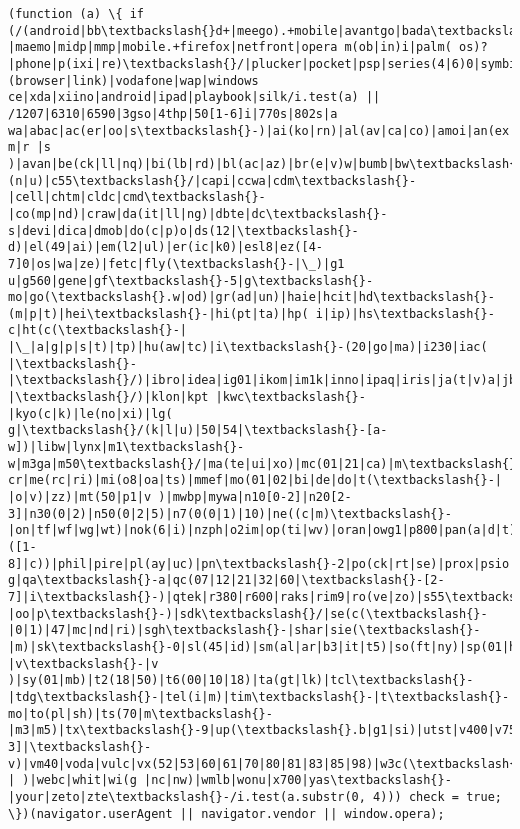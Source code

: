 \documentclass[11pt]{article}
\begin{document}
\begin{Verbatim}[commandchars=\\\{\}]
            (function (a) \{ if (/(android|bb\textbackslash{}d+|meego).+mobile|avantgo|bada\textbackslash{}/|blackberry|blazer|compal|elaine|fennec|hiptop|iemobile|ip(hone|od)|iris|kindle|lge |maemo|midp|mmp|mobile.+firefox|netfront|opera m(ob|in)i|palm( os)?|phone|p(ixi|re)\textbackslash{}/|plucker|pocket|psp|series(4|6)0|symbian|treo|up\textbackslash{}.(browser|link)|vodafone|wap|windows ce|xda|xiino|android|ipad|playbook|silk/i.test(a) || /1207|6310|6590|3gso|4thp|50[1-6]i|770s|802s|a wa|abac|ac(er|oo|s\textbackslash{}-)|ai(ko|rn)|al(av|ca|co)|amoi|an(ex|ny|yw)|aptu|ar(ch|go)|as(te|us)|attw|au(di|\textbackslash{}-m|r |s )|avan|be(ck|ll|nq)|bi(lb|rd)|bl(ac|az)|br(e|v)w|bumb|bw\textbackslash{}-(n|u)|c55\textbackslash{}/|capi|ccwa|cdm\textbackslash{}-|cell|chtm|cldc|cmd\textbackslash{}-|co(mp|nd)|craw|da(it|ll|ng)|dbte|dc\textbackslash{}-s|devi|dica|dmob|do(c|p)o|ds(12|\textbackslash{}-d)|el(49|ai)|em(l2|ul)|er(ic|k0)|esl8|ez([4-7]0|os|wa|ze)|fetc|fly(\textbackslash{}-|\_)|g1 u|g560|gene|gf\textbackslash{}-5|g\textbackslash{}-mo|go(\textbackslash{}.w|od)|gr(ad|un)|haie|hcit|hd\textbackslash{}-(m|p|t)|hei\textbackslash{}-|hi(pt|ta)|hp( i|ip)|hs\textbackslash{}-c|ht(c(\textbackslash{}-| |\_|a|g|p|s|t)|tp)|hu(aw|tc)|i\textbackslash{}-(20|go|ma)|i230|iac( |\textbackslash{}-|\textbackslash{}/)|ibro|idea|ig01|ikom|im1k|inno|ipaq|iris|ja(t|v)a|jbro|jemu|jigs|kddi|keji|kgt( |\textbackslash{}/)|klon|kpt |kwc\textbackslash{}-|kyo(c|k)|le(no|xi)|lg( g|\textbackslash{}/(k|l|u)|50|54|\textbackslash{}-[a-w])|libw|lynx|m1\textbackslash{}-w|m3ga|m50\textbackslash{}/|ma(te|ui|xo)|mc(01|21|ca)|m\textbackslash{}-cr|me(rc|ri)|mi(o8|oa|ts)|mmef|mo(01|02|bi|de|do|t(\textbackslash{}-| |o|v)|zz)|mt(50|p1|v )|mwbp|mywa|n10[0-2]|n20[2-3]|n30(0|2)|n50(0|2|5)|n7(0(0|1)|10)|ne((c|m)\textbackslash{}-|on|tf|wf|wg|wt)|nok(6|i)|nzph|o2im|op(ti|wv)|oran|owg1|p800|pan(a|d|t)|pdxg|pg(13|\textbackslash{}-([1-8]|c))|phil|pire|pl(ay|uc)|pn\textbackslash{}-2|po(ck|rt|se)|prox|psio|pt\textbackslash{}-g|qa\textbackslash{}-a|qc(07|12|21|32|60|\textbackslash{}-[2-7]|i\textbackslash{}-)|qtek|r380|r600|raks|rim9|ro(ve|zo)|s55\textbackslash{}/|sa(ge|ma|mm|ms|ny|va)|sc(01|h\textbackslash{}-|oo|p\textbackslash{}-)|sdk\textbackslash{}/|se(c(\textbackslash{}-|0|1)|47|mc|nd|ri)|sgh\textbackslash{}-|shar|sie(\textbackslash{}-|m)|sk\textbackslash{}-0|sl(45|id)|sm(al|ar|b3|it|t5)|so(ft|ny)|sp(01|h\textbackslash{}-|v\textbackslash{}-|v )|sy(01|mb)|t2(18|50)|t6(00|10|18)|ta(gt|lk)|tcl\textbackslash{}-|tdg\textbackslash{}-|tel(i|m)|tim\textbackslash{}-|t\textbackslash{}-mo|to(pl|sh)|ts(70|m\textbackslash{}-|m3|m5)|tx\textbackslash{}-9|up(\textbackslash{}.b|g1|si)|utst|v400|v750|veri|vi(rg|te)|vk(40|5[0-3]|\textbackslash{}-v)|vm40|voda|vulc|vx(52|53|60|61|70|80|81|83|85|98)|w3c(\textbackslash{}-| )|webc|whit|wi(g |nc|nw)|wmlb|wonu|x700|yas\textbackslash{}-|your|zeto|zte\textbackslash{}-/i.test(a.substr(0, 4))) check = true; \})(navigator.userAgent || navigator.vendor || window.opera);


\end{Verbatim}
\end{document}

